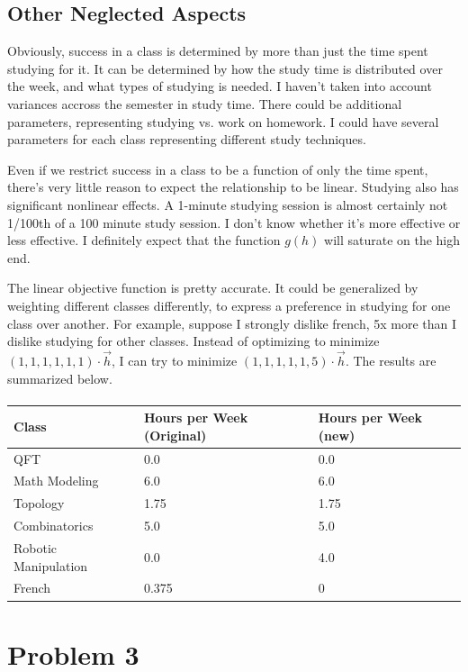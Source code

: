 \documentclass{article}
\begin{document}
\subsection{Other Neglected Aspects}


Obviously, success in a class is determined by more than just the time
	spent studying for it.
It can be determined by how the study time is distributed over the week,
	and what types of studying is needed.
I haven't taken into account variances accross the semester in study time.
There could be additional parameters, representing studying vs. work on homework.
I could have several parameters for each class representing different study techniques.

Even if we restrict success in a class to be a function of only the time spent,
	there's very little reason to expect the relationship to be linear.
Studying also has significant nonlinear effects.
A 1-minute studying session is almost certainly not 1/100th of a 100 minute 
	study session.
I don't know whether it's more effective or less effective.
I definitely expect that the function $g(h)$ will saturate on the high end.

The linear objective function is pretty accurate.
It could be generalized by weighting different classes differently,
	to express a preference in studying for one class over another. 
For example, suppose I strongly dislike french, 5x more than I dislike studying
	for other classes.
Instead of optimizing to minimize $(1,1,1,1,1,1) \cdot \vec{h}$, I can try to minimize
	$(1,1,1,1,1,5) \cdot \vec{h}$.
The results are summarized below.

\paragraph{}
\begin{tabular}{|l|l|l|}
\hline
Class & Hours per Week (Original) & Hours per Week (new)\\
\hline
QFT & 0.0 & 0.0\\
\hline
Math Modeling & 6.0 & 6.0\\
\hline
Topology & 1.75 & 1.75\\
\hline
Combinatorics & 5.0 & 5.0\\
\hline 
Robotic Manipulation & 0.0 & 4.0\\
\hline
French & 0.375 & 0 \\
\hline
\end{tabular}


\section{Problem 3}
\end{document}
